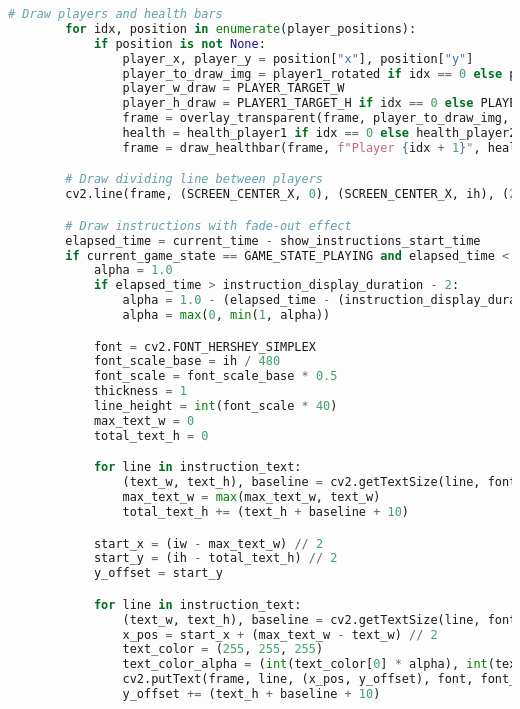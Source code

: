 \documentclass[11pt,a4paper]{article}
\begin{document}
\begin{lstlisting}[language=Python, caption=fungsi main]
        # Draw players and health bars
        for idx, position in enumerate(player_positions):
            if position is not None:
                player_x, player_y = position["x"], position["y"]
                player_to_draw_img = player1_rotated if idx == 0 else player2_rotated
                player_w_draw = PLAYER_TARGET_W
                player_h_draw = PLAYER1_TARGET_H if idx == 0 else PLAYER2_TARGET_H
                frame = overlay_transparent(frame, player_to_draw_img, player_x, player_y, (player_w_draw, player_h_draw))
                health = health_player1 if idx == 0 else health_player2
                frame = draw_healthbar(frame, f"Player {idx + 1}", health, player_x, player_y - 20)

        # Draw dividing line between players
        cv2.line(frame, (SCREEN_CENTER_X, 0), (SCREEN_CENTER_X, ih), (255, 255, 255), 2)

        # Draw instructions with fade-out effect
        elapsed_time = current_time - show_instructions_start_time
        if current_game_state == GAME_STATE_PLAYING and elapsed_time < instruction_display_duration:
            alpha = 1.0
            if elapsed_time > instruction_display_duration - 2:
                alpha = 1.0 - (elapsed_time - (instruction_display_duration - 2)) / 2.0
                alpha = max(0, min(1, alpha))

            font = cv2.FONT_HERSHEY_SIMPLEX
            font_scale_base = ih / 480
            font_scale = font_scale_base * 0.5
            thickness = 1
            line_height = int(font_scale * 40)
            max_text_w = 0
            total_text_h = 0

            for line in instruction_text:
                (text_w, text_h), baseline = cv2.getTextSize(line, font, font_scale, thickness)
                max_text_w = max(max_text_w, text_w)
                total_text_h += (text_h + baseline + 10)

            start_x = (iw - max_text_w) // 2
            start_y = (ih - total_text_h) // 2
            y_offset = start_y

            for line in instruction_text:
                (text_w, text_h), baseline = cv2.getTextSize(line, font, font_scale, thickness)
                x_pos = start_x + (max_text_w - text_w) // 2
                text_color = (255, 255, 255)
                text_color_alpha = (int(text_color[0] * alpha), int(text_color[1] * alpha), int(text_color[2] * alpha))
                cv2.putText(frame, line, (x_pos, y_offset), font, font_scale, text_color_alpha, thickness, cv2.LINE_AA)
                y_offset += (text_h + baseline + 10)


\end{lstlisting}
\end{document}
